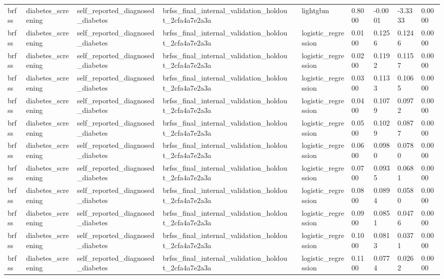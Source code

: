 \begin{tabular}{llllllllll}
brfss & diabetes\_screening & self\_reported\_diagnosed\_diabetes & brfss\_final\_internal\_validation\_holdout\_2cfa4a7e2a3a &  & lightgbm & 0.8000 & -0.0001 & -3.3333 & 0.0000 \\
brfss & diabetes\_screening & self\_reported\_diagnosed\_diabetes & brfss\_final\_internal\_validation\_holdout\_2cfa4a7e2a3a &  & logistic\_regression & 0.0100 & 0.1256 & 0.1246 & 0.0000 \\
brfss & diabetes\_screening & self\_reported\_diagnosed\_diabetes & brfss\_final\_internal\_validation\_holdout\_2cfa4a7e2a3a &  & logistic\_regression & 0.0200 & 0.1192 & 0.1157 & 0.0000 \\
brfss & diabetes\_screening & self\_reported\_diagnosed\_diabetes & brfss\_final\_internal\_validation\_holdout\_2cfa4a7e2a3a &  & logistic\_regression & 0.0300 & 0.1133 & 0.1065 & 0.0000 \\
brfss & diabetes\_screening & self\_reported\_diagnosed\_diabetes & brfss\_final\_internal\_validation\_holdout\_2cfa4a7e2a3a &  & logistic\_regression & 0.0400 & 0.1079 & 0.0972 & 0.0000 \\
brfss & diabetes\_screening & self\_reported\_diagnosed\_diabetes & brfss\_final\_internal\_validation\_holdout\_2cfa4a7e2a3a &  & logistic\_regression & 0.0500 & 0.1029 & 0.0877 & 0.0000 \\
brfss & diabetes\_screening & self\_reported\_diagnosed\_diabetes & brfss\_final\_internal\_validation\_holdout\_2cfa4a7e2a3a &  & logistic\_regression & 0.0600 & 0.0980 & 0.0780 & 0.0000 \\
brfss & diabetes\_screening & self\_reported\_diagnosed\_diabetes & brfss\_final\_internal\_validation\_holdout\_2cfa4a7e2a3a &  & logistic\_regression & 0.0700 & 0.0935 & 0.0681 & 0.0000 \\
brfss & diabetes\_screening & self\_reported\_diagnosed\_diabetes & brfss\_final\_internal\_validation\_holdout\_2cfa4a7e2a3a &  & logistic\_regression & 0.0800 & 0.0894 & 0.0580 & 0.0000 \\
brfss & diabetes\_screening & self\_reported\_diagnosed\_diabetes & brfss\_final\_internal\_validation\_holdout\_2cfa4a7e2a3a &  & logistic\_regression & 0.0900 & 0.0851 & 0.0476 & 0.0000 \\
brfss & diabetes\_screening & self\_reported\_diagnosed\_diabetes & brfss\_final\_internal\_validation\_holdout\_2cfa4a7e2a3a &  & logistic\_regression & 0.1000 & 0.0813 & 0.0371 & 0.0000 \\
brfss & diabetes\_screening & self\_reported\_diagnosed\_diabetes & brfss\_final\_internal\_validation\_holdout\_2cfa4a7e2a3a &  & logistic\_regression & 0.1100 & 0.0774 & 0.0262 & 0.0000 \\

\end{tabular}
